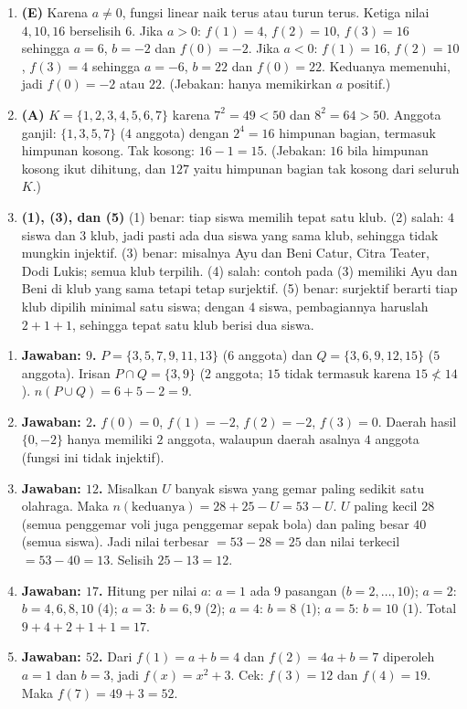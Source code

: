 \documentclass[a4paper,11pt]{article}
\newcounter{no}
\begin{document}
\begin{enumerate}[leftmargin=2em,itemsep=2pt,topsep=2pt]
\item[\textbf{10.}] \textbf{(E)} Karena $a\ne0$, fungsi linear naik terus atau turun terus. Ketiga nilai $4,10,16$ berselisih $6$. Jika $a>0$: $f(1)=4$, $f(2)=10$, $f(3)=16$ sehingga $a=6$, $b=-2$ dan $f(0)=-2$. Jika $a<0$: $f(1)=16$, $f(2)=10$, $f(3)=4$ sehingga $a=-6$, $b=22$ dan $f(0)=22$. Keduanya memenuhi, jadi $f(0)=-2$ atau $22$. (Jebakan: hanya memikirkan $a$ positif.)
\item[\textbf{11.}] \textbf{(A)} $K=\{1,2,3,4,5,6,7\}$ karena $7^2=49<50$ dan $8^2=64>50$. Anggota ganjil: $\{1,3,5,7\}$ ($4$ anggota) dengan $2^4=16$ himpunan bagian, termasuk himpunan kosong. Tak kosong: $16-1=15$. (Jebakan: $16$ bila himpunan kosong ikut dihitung, dan $127$ yaitu himpunan bagian tak kosong dari seluruh $K$.)
\item[\textbf{12.}] \textbf{(1), (3), dan (5)} (1) benar: tiap siswa memilih tepat satu klub. (2) salah: $4$ siswa dan $3$ klub, jadi pasti ada dua siswa yang sama klub, sehingga tidak mungkin injektif. (3) benar: misalnya Ayu dan Beni Catur, Citra Teater, Dodi Lukis; semua klub terpilih. (4) salah: contoh pada (3) memiliki Ayu dan Beni di klub yang sama tetapi tetap surjektif. (5) benar: surjektif berarti tiap klub dipilih minimal satu siswa; dengan $4$ siswa, pembagiannya haruslah $2+1+1$, sehingga tepat satu klub berisi dua siswa.
\end{enumerate}
\par{}\par\vspace{0.2em}
\small\begin{enumerate}[leftmargin=2em,itemsep=2pt,topsep=2pt]
\item[\textbf{1.}] \textbf{Jawaban: $9$.} $P=\{3,5,7,9,11,13\}$ ($6$ anggota) dan $Q=\{3,6,9,12,15\}$ ($5$ anggota). Irisan $P\cap Q=\{3,9\}$ ($2$ anggota; $15$ tidak termasuk karena $15\not<14$). $n(P\cup Q)=6+5-2=9$.
\item[\textbf{2.}] \textbf{Jawaban: $2$.} $f(0)=0$, $f(1)=-2$, $f(2)=-2$, $f(3)=0$. Daerah hasil $\{0,-2\}$ hanya memiliki $2$ anggota, walaupun daerah asalnya $4$ anggota (fungsi ini tidak injektif).
\item[\textbf{3.}] \textbf{Jawaban: $12$.} Misalkan $U$ banyak siswa yang gemar paling sedikit satu olahraga. Maka $n(\text{keduanya})=28+25-U=53-U$. $U$ paling kecil $28$ (semua penggemar voli juga penggemar sepak bola) dan paling besar $40$ (semua siswa). Jadi nilai terbesar $=53-28=25$ dan nilai terkecil $=53-40=13$. Selisih $25-13=12$.
\item[\textbf{4.}] \textbf{Jawaban: $17$.} Hitung per nilai $a$: $a=1$ ada $9$ pasangan ($b=2,\dots,10$); $a=2$: $b=4,6,8,10$ ($4$); $a=3$: $b=6,9$ ($2$); $a=4$: $b=8$ ($1$); $a=5$: $b=10$ ($1$). Total $9+4+2+1+1=17$.
\item[\textbf{5.}] \textbf{Jawaban: $52$.} Dari $f(1)=a+b=4$ dan $f(2)=4a+b=7$ diperoleh $a=1$ dan $b=3$, jadi $f(x)=x^2+3$. Cek: $f(3)=12$ dan $f(4)=19$. Maka $f(7)=49+3=52$.
\end{enumerate}
\end{document}
